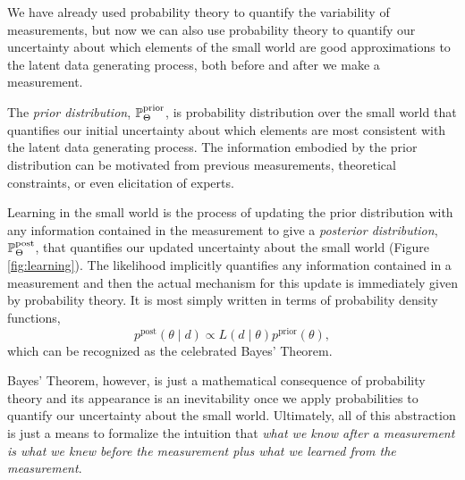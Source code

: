 We have already used probability theory to quantify the variability of
measurements, but now we can also use probability theory to quantify 
our uncertainty about which elements of the small world are good 
approximations to the latent data generating process, both before
and after we make a measurement.

The \emph{prior distribution}, $\mathbb{P}_{\Theta}^{\mathrm{prior}}$, is  
probability distribution over the small world that quantifies our initial
uncertainty about which elements are most consistent with the latent 
data generating process.  The information embodied by the prior 
distribution can be motivated from previous measurements, 
theoretical constraints, or even elicitation of experts.  

Learning in the small world is the process of updating the prior 
distribution with any information contained in the measurement 
to give a \emph{posterior distribution}, $\mathbb{P}_{\Theta}^{\mathrm{post}}$, 
that quantifies our updated uncertainty about the small world (Figure
\ref{fig:learning}).  The likelihood implicitly quantifies any information
contained in a measurement and then the actual mechanism for this 
update is immediately given by probability theory.  It is most simply 
written in terms of probability density functions,
%
\begin{equation*}
p^{\mathrm{post}} \! \left( \theta \mid d \right)
\propto
L \! \left( d \mid \theta \right) p^{\mathrm{prior}} \! \left( \theta \right),
\end{equation*}
%
which can be recognized as the celebrated Bayes' Theorem.

Bayes' Theorem, however, is just a mathematical consequence of 
probability theory and its appearance is an inevitability once we 
apply probabilities to quantify our uncertainty about the small world.
Ultimately, all of this abstraction is just a means to formalize the intuition 
that \emph{what we know after a measurement is what we knew before 
the measurement plus what we learned from the measurement}.

